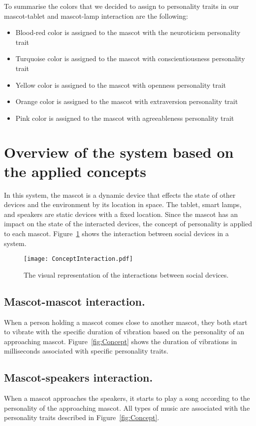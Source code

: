 To summarise the colors that we decided to assign to personality traits in our
mascot-tablet and mascot-lamp interaction are the following:
\begin{itemize}
\item Blood-red color is assigned to the mascot with the neuroticism personality trait
\item Turquoise color is assigned to the mascot with conscientiousness personality trait
\item Yellow color is assigned to the mascot with openness personality trait
\item Orange color is assigned to the mascot with extraversion personality trait
\item Pink color is assigned to the mascot with agreeableness personality trait
\end{itemize}


\section{Overview of the system based on the applied concepts}
\label{sec:overview-of-the-system-based-on-the-applied-concepts.}
In this system, the mascot is a dynamic device that effects the state of other
devices and the environment by its location in space.
The tablet, smart lamps, and speakers are static devices with a fixed location.
Since the mascot has an impact on the state of the interacted devices,
the concept of personality is applied to each mascot.
Figure~\ref{fig:ConceptInteraction} shows the interaction between social devices in a system.
\begin{figure}[hbt!]
    \centering
    \texttt{[image: ConceptInteraction.pdf]}
    \caption{The visual representation of the interactions between social devices.}
    \label{fig:ConceptInteraction}
\end{figure}

\subsection*{Mascot-mascot interaction.}
When a person holding a mascot comes close to another mascot, they both start to vibrate with
the specific duration of vibration based on the personality of an approaching mascot.
Figure~\ref{fig:Concept} shows the duration of vibrations in milliseconds associated with
specific personality traits.

\subsection*{Mascot-speakers interaction.}
When a mascot approaches the speakers, it starts to play a song according to the personality of the approaching mascot.
All types of music are associated with the personality traits described in Figure~\ref{fig:Concept}.

